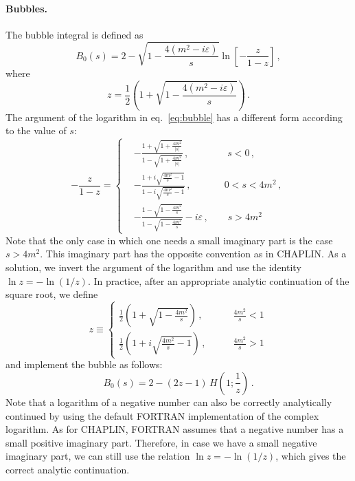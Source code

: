 \documentclass[12pt]{article}
\begin{document}
\paragraph{Bubbles.} The bubble integral is defined as
\begin{equation}
  \label{eq:bubble}
  B_0(s)=2 -\sqrt{1-\frac{4(m^2-i\varepsilon)}{s}}\ln\left[-\frac{z}{1-z}\right]\,,
\end{equation}
where 
\begin{equation}
  \label{eq:z}
  z=\frac{1}{2}\left(1+\sqrt{1-\frac{4(m^2-i\varepsilon)}{s}}\right)\,.
\end{equation}
The argument of the logarithm in eq.~\eqref{eq:bubble} has a different
form according to the value of $s$:
\begin{equation}
  \label{eq:z-omz}
  -\frac{z}{1-z} = \left\{
    \begin{split}
      &-\frac{1+\sqrt{1+\frac{4m^2}{|s|}}}{1-\sqrt{1+\frac{4m^2}{|s|}}}\,,\qquad \qquad s<0\,,\\
        & -\frac{1+i\sqrt{\frac{4m^2}{s}-1}}{1-i\sqrt{\frac{4m^2}{s}-1}}\,,\qquad \quad\>\> 0<s<4m^2\,,\\
        &
        -\frac{1-\sqrt{1-\frac{4m^2}{s}}}{1-\sqrt{1-\frac{4m^2}{s}}}-i\varepsilon\,,\qquad
        s>4m^2
    \end{split}
\right.
\end{equation}
Note that the only case in which one needs a small imaginary part is
the case $s>4m^2$. This imaginary part has the opposite convention as
in CHAPLIN. As a solution, we invert the argument of the logarithm and
use the identity $\ln z = -\ln(1/z)$. In practice, after an appropriate analytic
continuation of the square root, we define
\begin{equation}
  \label{eq:z-implemented}
  z \equiv \left\{\begin{split}
      \frac{1}{2}\left(1+\sqrt{1-\frac{4m^2}{s}}\right)\,,& \qquad \frac{4m^2}{s}<1\\
      \frac{1}{2}\left(1+i\sqrt{\frac{4m^2}{s}-1}\right)\,,& \qquad \frac{4m^2}{s}>1
    \end{split}
    \right.
  \end{equation}
and implement the bubble as follows:
\begin{equation}
  \label{eq:bubble-implemented}
  B_0(s)=
      2 -(2 z-1) \,H\left(1;\frac{1}{z}\right) \,.
\end{equation}
Note that a logarithm of a negative number can also be correctly
analytically continued by using the default FORTRAN implementation
of the complex logarithm. As for CHAPLIN, FORTRAN assumes that a
negative number has a small positive imaginary part. Therefore, in
case we have a small negative imaginary part, we can still use the
relation $\ln z = -\ln(1/z)$, which gives the correct analytic continuation.
\end{document}
